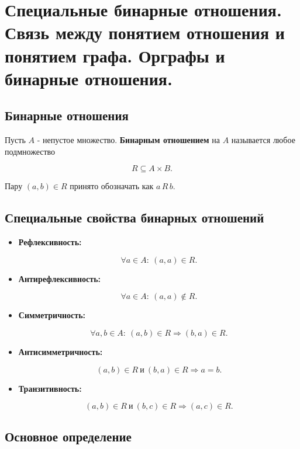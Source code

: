 {
	\section{Специальные бинарные отношения. Связь между понятием отношения и понятием
графа. Орграфы и бинарные отношения.}


\subsection*{Бинарные отношения}
Пусть $A$ - непустое множество. \textbf{Бинарным отношением} на $A$ называется любое подмножество


\[
R \subseteq A \times B.
\]


Пару $(a,b) \in R$ принято обозначать как $a\,R\,b$.

\subsection*{Специальные свойства бинарных отношений}

\begin{itemize}
    \item \textbf{Рефлексивность:} 
    

\[
    \forall a \in A:\ (a,a) \in R.
    \]



    \item \textbf{Антирефлексивность:}
    

\[
    \forall a \in A:\ (a,a) \notin R.
    \]



    \item \textbf{Симметричность:}
    

\[
    \forall a,b \in A:\ (a,b) \in R \Rightarrow (b,a) \in R.
    \]



    \item \textbf{Антисимметричность:}
    

\[
    (a,b)\in R \ \text{и}\ (b,a)\in R \Rightarrow a=b.
    \]



    \item \textbf{Транзитивность:}
    

\[
    (a,b)\in R \ \text{и}\ (b,c)\in R \Rightarrow (a,c)\in R.
    \]


\end{itemize}

\subsection*{Основное определение}

}

